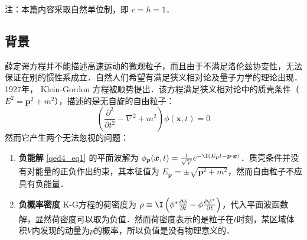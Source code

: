 

注：本篇内容采取自然单位制，即 $c=\hbar=1$．
\subsection{背景}
薛定谔方程并不能描述高速运动的微观粒子，而且由于不满足洛伦兹协变性，无法保证在别的惯性系成立．自然人们希望有满足狭义相对论及量子力学的理论出现．1927年， Klein-Gordon 方程被顺势提出．该方程满足狭义相对论中的质壳条件（$E^{2}=\boldsymbol{p}^{2}+m^{2}$），描述的是无自旋的自由粒子：
\begin{equation}\label{qed4_eq1}
\left(\frac{\partial^{2}}{\partial t^{2}}-\nabla^{2}+m^{2}\right) \phi(\boldsymbol{x}, t)=0
\end{equation}
然而它产生两个无法忽视的问题：

\begin{enumerate}
\item \textbf{负能解}
\autoref{qed4_eq1} 的平面波解为 $\phi_{\boldsymbol{p}}(\boldsymbol{x}, t)=\frac{1}{\sqrt{V}} e^{- \I\left(E_{\boldsymbol{p}} t-\boldsymbol{p} \cdot \boldsymbol{x}\right)}$．质壳条件并没有对能量的正负作出约束，其本征值为
$E_{\boldsymbol{p}}=\pm \sqrt{\boldsymbol{p}^{2}+m^{2}}$，然而自由粒子不应具有负能量．
\item \textbf{负概率密度}
K-G方程的荷密度为 $\rho \equiv  \I\left(\phi^{*} \frac{\partial \phi}{\partial t}-\phi \frac{\partial \phi^{*}}{\partial t}\right)$，代入平面波函数解，显然荷密度可以取为负值．然而荷密度表示的是粒子在$t$时刻，某区域体积$V$内发现的动量为$p$的概率，所以负值是没有物理意义的．
\end{enumerate}
